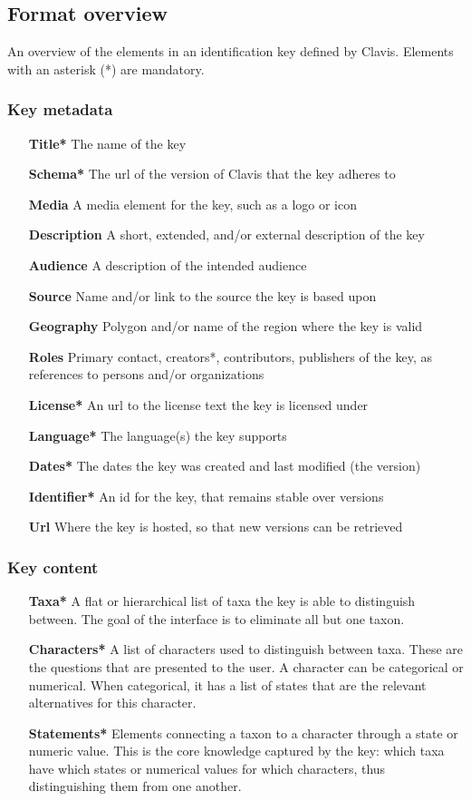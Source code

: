 \documentclass[10pt,letterpaper]{article}
\begin{document}
\subsection*{
Format overview
}
An overview of the elements in an identification key defined by Clavis. Elements with an asterisk (*) are mandatory.

\subsubsection*{
Key metadata
}
\begin{itemize}
\item[\textbf{Title*}]
The name of the key
\item[\textbf{Schema*}]
The url of the version of Clavis that the key adheres to
\item[\textbf{Media}]
A media element for the key, such as a logo or icon
\item[\textbf{Description}]
A short, extended, and/or external description of the key
\item[\textbf{Audience}]
A description of the intended audience
\item[\textbf{Source}]
Name and/or link to the source the key is based upon
\item[\textbf{Geography}]
Polygon and/or name of the region where the key is valid
\item[\textbf{Roles}]
Primary contact, creators*, contributors, publishers of the key, as references to persons and/or organizations
\item[\textbf{License*}]
An url to the license text the key is licensed under
\item[\textbf{Language*}]
The language(s) the key supports
\item[\textbf{Dates*}]
The dates the key was created and last modified (the version)
\item[\textbf{Identifier*}]
An id for the key, that remains stable over versions
\item[\textbf{Url}]
Where the key is hosted, so that new versions can be retrieved
\end{itemize}
\subsubsection*{
Key content
}
\begin{itemize}
\item[\textbf{Taxa*}]
A flat or hierarchical list of taxa the key is able to distinguish between. The goal of the interface is to eliminate all but one taxon.
\item[\textbf{Characters*}]
A list of characters used to distinguish between taxa. These are the questions that are presented to the user. A character can be categorical or numerical. When categorical, it has a list of states that are the relevant alternatives for this character.
\item[\textbf{Statements*}]
Elements connecting a taxon to a character through a state or numeric value. This is the core knowledge captured by the key: which taxa have which states or numerical values for which characters, thus distinguishing them from one another.
\end{itemize}
\end{document}
